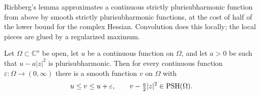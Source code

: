 
Richberg's lemma approximates a continuous strictly plurisubharmonic function from above by smooth strictly plurisubharmonic functions, at the cost of half of the lower bound for the complex Hessian. Convolution does this locally; the local pieces are glued by a regularized maximum.

\begin{lemma}[Richberg]\label{lem:richberg-euclidean}
Let $\Omega\subset\mathbb C^n$ be open, let $u$ be a continuous function on $\Omega$, and let $a>0$ be such that $u-a|z|^2$ is plurisubharmonic. Then for every continuous function $\varepsilon\colon\Omega\to(0,\infty)$ there is a smooth function $v$ on $\Omega$ with
\[
 u\le v\le u+\varepsilon,\qquad v-\tfrac a2|z|^2\in\mathrm{PSH}(\Omega).
\]
\end{lemma}
